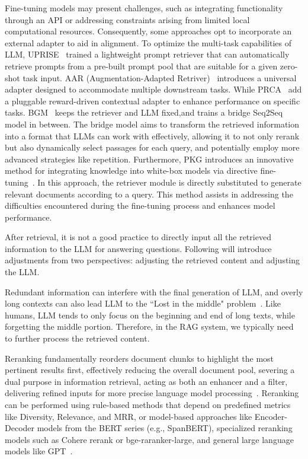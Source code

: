 Fine-tuning models may present challenges, such as integrating functionality through an API or addressing constraints arising from limited local computational resources. Consequently, some approaches opt to incorporate an external adapter to aid in alignment.
To optimize the multi-task capabilities of LLM, UPRISE~ trained a lightweight prompt retriever that can automatically retrieve prompts from a pre-built prompt pool that are suitable for a given zero-shot task input. AAR (Augmentation-Adapted Retriver)~ introduces a universal adapter designed to accommodate multiple downstream tasks. While  PRCA~ add a pluggable reward-driven contextual adapter to enhance performance on specific tasks. BGM~ keeps the retriever and LLM fixed,and trains a bridge Seq2Seq model in between. The bridge model aims to transform the retrieved information into a format that LLMs can work with effectively, allowing it to not only rerank but also dynamically select passages for each query, and potentially employ more advanced strategies like repetition.  Furthermore, PKG introduces an innovative method for integrating knowledge into white-box models via directive fine-tuning~. In this approach, the retriever module is directly substituted to generate relevant documents according to a query. This method assists in addressing the difficulties encountered during the fine-tuning process and enhances model performance.

\label{sec:generation}
After retrieval, it is not a good practice to directly input all the retrieved information to the LLM for answering questions. Following will introduce adjustments from two perspectives: adjusting the retrieved content and adjusting the LLM.

Redundant information can interfere with the final generation of LLM, and overly long contexts can also lead LLM to the ``Lost in the middle" problem~. Like humans, LLM tends to only focus on the beginning and end of long texts, while forgetting the middle portion. Therefore, in the RAG system, we typically need to further process the retrieved content.

Reranking fundamentally reorders document chunks to highlight the most pertinent results first, effectively reducing the overall document pool, severing a dual purpose in information retrieval, acting as both an enhancer and a filter, delivering refined inputs for more precise language model processing~. Reranking can be performed using rule-based methods that depend on predefined metrics like Diversity, Relevance, and MRR, or model-based approaches like Encoder-Decoder models from the BERT series (e.g., SpanBERT), specialized reranking models such as Cohere rerank or bge-raranker-large, and general large language models like GPT~.

